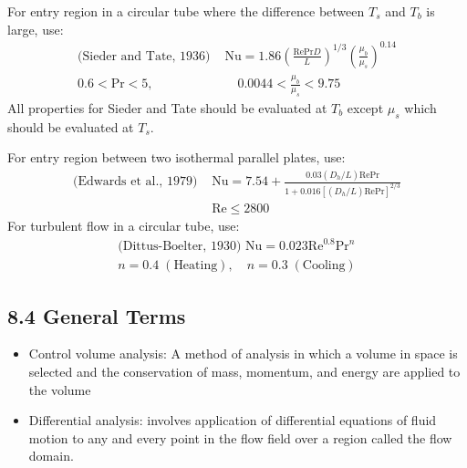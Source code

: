 \documentclass[10pt]{article}
\begin{document}
\begin{multicols*}{2}
For entry region in a circular tube where the difference between $T_s$ and $T_b$ is large, use:
\vspace{-0.3cm}
\begin{align*}
    \text{(Sieder and Tate, 1936) } &\text{Nu} = 1.86\left(\frac{\text{Re} \text{Pr} D}{L}\right)^{1/3} \left(\frac{\mu_b}{\mu_s}\right)^{0.14} \\
    0.6 < \text{Pr} < 5, &\quad 0.0044 < \frac{\mu_b}{\mu_s} < 9.75
\end{align*}
All properties for Sieder and Tate should be evaluated at $T_b$ except $\mu_s$ which should be evaluated at $T_s$.

For entry region between two isothermal parallel plates, use:
\vspace{-0.3cm}
\begin{align*}
    \text{(Edwards et al., 1979) } &\text{Nu} = 7.54 + \frac{0.03(D_h/L) \text{Re} \text{Pr}}{1 + 0.016[(D_h/L) \text{Re} \text{Pr}]^{2/3}} \\
    &\text{Re} \leq 2800
\end{align*}
For turbulent flow in a circular tube, use:
\vspace{-0.3cm}
\begin{align*}
    \text{(Dittus-Boelter, 1930) } \text{Nu} = 0.023 \text{Re}^{0.8} \text{Pr}^{n}  \\
    n = 0.4 \; (\text{Heating}), \quad n = 0.3 \; (\text{Cooling}) 
\end{align*}

\subsection*{8.4 General Terms}
\begin{itemize}
    \item Control volume analysis: A method of analysis in which a volume in space is selected and the conservation of mass, momentum, and energy are applied to the volume
    \item Differential analysis: involves application of differential equations of fluid motion to any and every point in the flow field over a region called the flow domain.
\end{itemize}

\end{multicols*}
\end{document}
